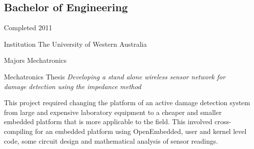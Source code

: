 \documentclass[10pt, a4paper]{report}
\begin{document}
\subsection*{Bachelor of Engineering}
	\begin{basedescript}{\desclabelstyle{\pushlabel}\desclabelwidth{11em}}
	\item[Completed] 2011
	\item[Institution] The University of Western Australia
	\item[Majors] Mechatronics
	\item[Mechatronics Thesis] {\em Developing a stand alone wireless sensor network for damage detection using the impedance method}
	\end{basedescript}
This project required changing the platform of an active damage detection system from large and expensive laboratory equipment to a cheaper and smaller embedded platform that is more applicable to the field. This involved cross-compiling for an embedded platform using OpenEmbedded, user and kernel level code, some circuit design and mathematical analysis of sensor readings.
\end{document}
